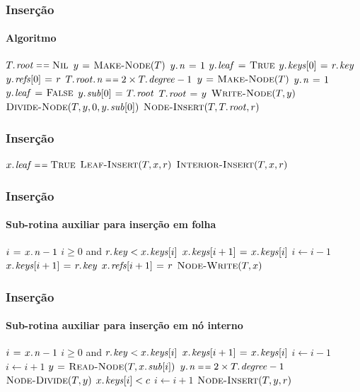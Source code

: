 \documentclass{beamer}
\begin{document}
\begin{frame}
\frametitle{Inserção}
\framesubtitle{Algoritmo}

{
\begin{codebox}
\li \If $\attrib{T}{root} \isequal \const{Nil}$
\li \Then $y \mathrel{\hspace{1pt}=\hspace{1pt}} \textnormal{\scshape Make-Node}(T)$
\li   $\attrib{y}{n} \gets 1$
\li   $\attrib{y}{leaf} \gets \const{True}$
\li   $\attrib{y}{keys}[0] \gets \attrib{r}{key}$
\li   $\attrib{y}{refs}[0] \gets r$
\li \ElseIf $\attrib{\attrib{T}{root}}{n} \isequal 2 \times \attrib{T}{degree} - 1 $
\li   \Then $y \mathrel{\hspace{1pt}=\hspace{1pt}} \textnormal{\scshape Make-Node}(T)$
\li   $\attrib{y}{n} \gets 1$
\li   $\attrib{y}{leaf} \gets \const{False}$
\li   $\attrib{y}{sub}[0] \gets \attrib{T}{root}$
\li   $\attrib{T}{root} \gets y$
\li   $\textnormal{\scshape Write-Node}(T, y)$
\li   $\proc{Divide-Node}(T, y, 0, \attrib{y}{sub}[0])$
    \End
\li $\proc{Node-Insert}(T, \attrib{T}{root}, r)$
\end{codebox}
}
\end{frame}

\begin{frame}
\frametitle{Inserção}

{
\begin{codebox}
\li \If $\attrib{x}{leaf} \isequal \const{True}$
\li \Then $\textnormal{\scshape Leaf-Insert}(T, x, r)$
\li \Else $\textnormal{\scshape Interior-Insert}(T, x, r)$
    \End
\end{codebox}
}
\end{frame}

\begin{frame}
\frametitle{Inserção}
\framesubtitle{Sub-rotina auxiliar para inserção em folha}
{
\begin{codebox}
\li $i \gets \attrib{x}{n}-1$
\li \While $i \ge 0$ and $\attrib{r}{key} < \attrib{x}{keys}[i]$
\li \Do $\attrib{x}{keys}[i+1] \gets \attrib{x}{keys}[i]$
\li   $i \gets i - 1$
    \End
\li $\attrib{x}{keys}[i+1] \gets \attrib{r}{key}$
\li $\attrib{x}{refs}[i+1] \gets r$
\li $\textnormal{\scshape Node-Write}(T, x)$
\end{codebox}
}
\end{frame}

\begin{frame}
\frametitle{Inserção}
\framesubtitle{Sub-rotina auxiliar para inserção em nó interno}

{
\begin{codebox}
\li $i \gets \attrib{x}{n}-1$
\li \While $i \ge 0$ and $\attrib{r}{key} < \attrib{x}{keys}[i]$
\li \Do $\attrib{x}{keys}[i+1] \gets \attrib{x}{keys}[i]$
\li   $i \gets i - 1$
    \End
\li $i \gets i + 1$
\li $y \gets \proc{Read-Node}(T, \attrib{x}{sub}[i])$
\li \If $\attrib{y}{n} \isequal 2 \times \attrib{T}{degree} - 1$
\li \Then $\textnormal{\scshape Node-Divide}(T, y)$
\li   \If $\attrib{x}{keys}[i] < c$
\li   \Then $i \gets i + 1$
      \End
    \End
\li $\textnormal{\scshape Node-Insert}(T, y, r)$
\end{codebox}
}
\end{frame}
\end{document}
